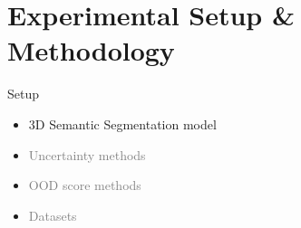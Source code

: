 \documentclass[aspectratio=169]{beamer}
\begin{document}
\section{Experimental Setup \& Methodology}
\begin{frame}[noframenumbering]{Setup}
    \begin{itemize}

        \item 3D Semantic Segmentation model
        \item \textcolor{gray}{Uncertainty methods}
        \item \textcolor{gray}{OOD score methods}
        \item \textcolor{gray}{Datasets}
    \end{itemize}
\end{frame}
\end{document}
